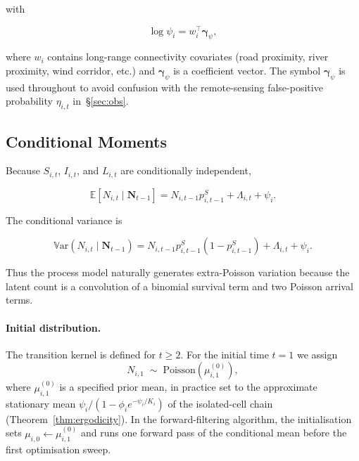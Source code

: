\documentclass[review,12pt]{elsarticle}
\theoremstyle{definition}
\newcommand{\E}{\mathbb{E}}
\newcommand{\Var}{\mathbb{V}\mathrm{ar}}
\begin{document}
with

\begin{equation}\label{eq:ldd}
\log\psi_i=w_i^\top\boldsymbol{\gamma}_\psi,
\end{equation}

where \(w_i\) contains long-range connectivity covariates (road proximity,
river proximity, wind corridor, etc.) and \(\boldsymbol{\gamma}_\psi\) is a
coefficient vector.  The symbol \(\boldsymbol{\gamma}_\psi\) is used
throughout to avoid confusion with the remote-sensing false-positive
probability \(\eta_{i,t}\) in~\S\ref{sec:obs}.

\subsection{Conditional Moments}

Because \(S_{i,t}\), \(I_{i,t}\), and \(L_{i,t}\) are conditionally independent,

\[
\E[N_{i,t}\mid \bm N_{t-1}]
=
N_{i,t-1}p^S_{i,t-1}+\Lambda_{i,t}+\psi_i.
\]

The conditional variance is

\[
\Var(N_{i,t}\mid \bm N_{t-1})
=
N_{i,t-1}p^S_{i,t-1}(1-p^S_{i,t-1})
+\Lambda_{i,t}+\psi_i.
\]

Thus the process model naturally generates extra-Poisson variation because the
latent count is a convolution of a binomial survival term and two Poisson arrival
terms.

\paragraph{Initial distribution.}
The transition kernel is defined for $t\ge2$.  For the initial time $t=1$ we
assign
\[
  N_{i,1}\;\sim\;\mathrm{Poisson}(\mu_{i,1}^{(0)}),
\]
where $\mu_{i,1}^{(0)}$ is a specified prior mean, in practice set to the
approximate stationary mean $\psi_i/(1-\phi_i e^{-\psi_i/K_i})$ of the
isolated-cell chain (Theorem~\ref{thm:ergodicity}).  In the forward-filtering
algorithm, the initialisation sets $\mu_{i,0}\leftarrow\mu_{i,1}^{(0)}$ and
runs one forward pass of the conditional mean before the first optimisation sweep.
\end{document}
